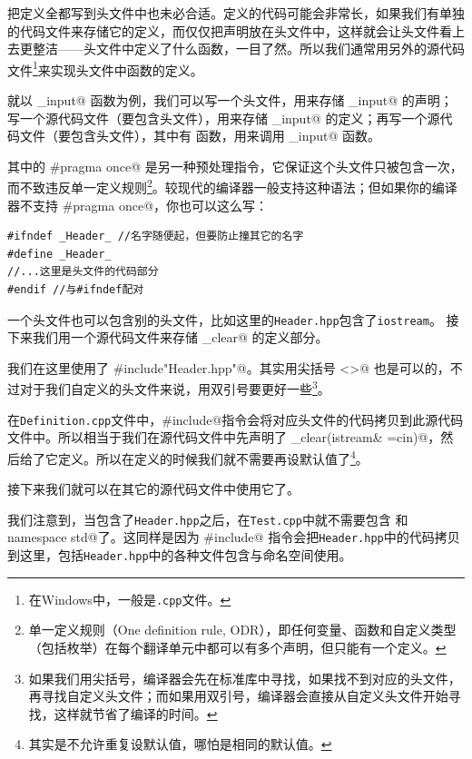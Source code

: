 把定义全都写到头文件中也未必合适。定义的代码可能会非常长，如果我们有单独的代码文件来存储它的定义，而仅仅把声明放在头文件中，这样就会让头文件看上去更整洁——头文件中定义了什么函数，一目了然。所以我们通常用另外的源代码文件\footnote{在Windows中，一般是\texttt{.cpp}文件。}来实现头文件中函数的定义。\par
就以 \lstinline@clear_input@ 函数为例，我们可以写一个头文件，用来存储 \lstinline@clear_input@ 的声明；写一个源代码文件（要包含头文件），用来存储 \lstinline@clear_input@ 的定义；再写一个源代码文件（要包含头文件），其中有 \lstinline@main@ 函数，用来调用 \lstinline@clear_input@ 函数。\par

其中的 \lstinline@#pragma once@ 是另一种预处理指令，它保证这个头文件只被包含一次，而不致违反单一定义规则\footnote{单一定义规则（One definition rule, ODR），即任何变量、函数和自定义类型（包括枚举）在每个翻译单元中都可以有多个声明，但只能有一个定义。}。较现代的编译器一般支持这种语法；但如果你的编译器不支持 
\lstinline@#pragma once@，你也可以这么写：
\begin{lstlisting}
#ifndef _Header_ //名字随便起，但要防止撞其它的名字
#define _Header_ 
//...这里是头文件的代码部分
#endif //与#ifndef配对
\end{lstlisting}\par
一个头文件也可以包含别的头文件，比如这里的\texttt{Header.hpp}包含了\texttt{iostream}。
接下来我们用一个源代码文件来存储 \lstinline@input_clear@ 的定义部分。

我们在这里使用了 \lstinline@#include"Header.hpp"@。其实用尖括号 \lstinline@<>@ 也是可以的，不过对于我们自定义的头文件来说，用双引号要更好一些\footnote{如果我们用尖括号，编译器会先在标准库中寻找，如果找不到对应的头文件，再寻找自定义头文件；而如果用双引号，编译器会直接从自定义头文件开始寻找，这样就节省了编译的时间。}。\par
在\texttt{Definition.cpp}文件中，\lstinline@#include@指令会将对应头文件的代码拷贝到此源代码文件中。所以相当于我们在源代码文件中先声明了 \lstinline@input_clear(istream& ={cin})@，然后给了它定义。所以在定义的时候我们就不需要再设默认值了\footnote{其实是不允许重复设默认值，哪怕是相同的默认值。}。\par
接下来我们就可以在其它的源代码文件中使用它了。

我们注意到，当包含了\texttt{Header.hpp}之后，在\texttt{Test.cpp}中就不需要包含 \lstinline@iostream@ 和 \lstinline@using namespace std@了。这同样是因为 \lstinline@#include@ 指令会把\texttt{Header.hpp}中的代码拷贝到这里，包括\texttt{Header.hpp}中的各种文件包含与命名空间使用。\par
